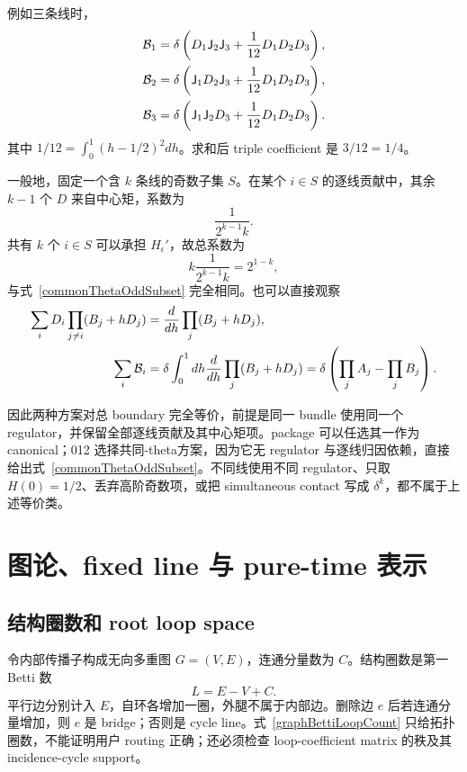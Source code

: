 ﻿\documentclass[a4paper,11pt]{article}
\begin{document}
例如三条线时，
\begin{align}
 {\cal B}_1&=\delta\left(D_1\mathsf J_2\mathsf J_3+\frac1{12}D_1D_2D_3\right),\\
 {\cal B}_2&=\delta\left(\mathsf J_1D_2\mathsf J_3+\frac1{12}D_1D_2D_3\right),\\
 {\cal B}_3&=\delta\left(\mathsf J_1\mathsf J_2D_3+\frac1{12}D_1D_2D_3\right).
\end{align}
其中 $1/12=\int_0^1(h-1/2)^2dh$。求和后 triple coefficient 是 $3/12=1/4$。

一般地，固定一个含 $k$ 条线的奇数子集 $S$。在某个 $i\in S$ 的逐线贡献中，其余 $k-1$ 个 $D$ 来自中心矩，系数为
\begin{equation}
 \frac{1}{2^{k-1}k}.
\end{equation}
共有 $k$ 个 $i\in S$ 可以承担 $H_\epsilon'$，故总系数为
\begin{equation}
 k\frac{1}{2^{k-1}k}=2^{1-k},
\end{equation}
与式~\eqref{commonThetaOddSubset} 完全相同。也可以直接观察
\begin{align}
 \sum_iD_i\prod_{j\ne i}(B_j+hD_j)
 &=\frac{d}{dh}\prod_j(B_j+hD_j),\\
 \sum_i{\cal B}_i
 &=\delta\int_0^1dh\frac{d}{dh}\prod_j(B_j+hD_j)
 =\delta\left(\prod_jA_j-\prod_jB_j\right).
\end{align}

因此两种方案对总 boundary 完全等价，前提是同一 bundle 使用同一个 regulator，并保留全部逐线贡献及其中心矩项。package 可以任选其一作为 canonical；012 选择共同-theta方案，因为它无 regulator 与逐线归因依赖，直接给出式~\eqref{commonThetaOddSubset}。不同线使用不同 regulator、只取 $H(0)=1/2$、丢弃高阶奇数项，或把 simultaneous contact 写成 $\delta^k$，都不属于上述等价类。

\section{图论、fixed line 与 pure-time 表示}

\subsection{结构圈数和 root loop space}

令内部传播子构成无向多重图 $G=(V,E)$，连通分量数为 $C$。结构圈数是第一 Betti 数
\begin{equation}
 L=E-V+C.
 \label{graphBettiLoopCount}
\end{equation}
平行边分别计入 $E$，自环各增加一圈，外腿不属于内部边。删除边 $e$ 后若连通分量增加，则 $e$ 是 bridge；否则是 cycle line。式~\eqref{graphBettiLoopCount} 只给拓扑圈数，不能证明用户 routing 正确；还必须检查 loop-coefficient matrix 的秩及其 incidence-cycle support。
\end{document}
